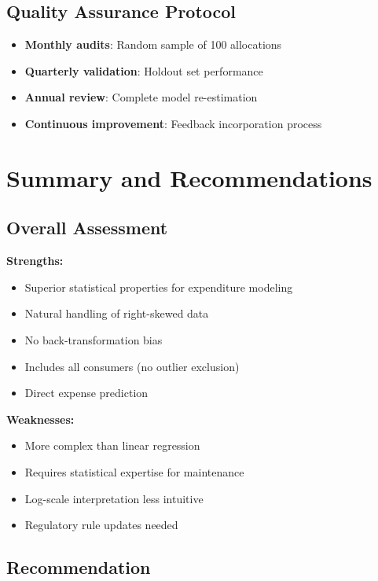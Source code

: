 \subsection{Quality Assurance Protocol}

\begin{itemize}
    \item \textbf{Monthly audits}: Random sample of 100 allocations
    \item \textbf{Quarterly validation}: Holdout set performance
    \item \textbf{Annual review}: Complete model re-estimation
    \item \textbf{Continuous improvement}: Feedback incorporation process
\end{itemize}

\section{Summary and Recommendations}

\subsection{Overall Assessment}

\textbf{Strengths:}
\begin{itemize}
    \item Superior statistical properties for expenditure modeling
    \item Natural handling of right-skewed data
    \item No back-transformation bias
    \item Includes all consumers (no outlier exclusion)
    \item Direct expense prediction
\end{itemize}

\textbf{Weaknesses:}
\begin{itemize}
    \item More complex than linear regression
    \item Requires statistical expertise for maintenance
    \item Log-scale interpretation less intuitive
    \item Regulatory rule updates needed
\end{itemize}

\subsection{Recommendation}

